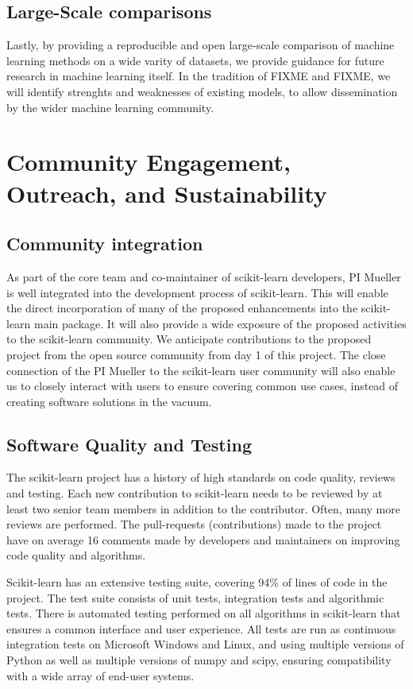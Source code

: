 \subsection{Large-Scale comparisons}
Lastly, by providing a reproducible and open large-scale comparison of machine learning
methods on a wide varity of datasets, we provide guidance for future research
in machine learning itself.
In the tradition of FIXME and FIXME, we will identify strenghts and weaknesses of existing
models, to allow dissemination by the wider machine learning community.

\section{Community Engagement, Outreach, and Sustainability}
\subsection{Community integration}
As part of the core team and co-maintainer of scikit-learn developers, PI
Mueller is well integrated into the development process of scikit-learn.
This will enable the direct incorporation of many of the proposed enhancements
into the scikit-learn main package.
It will also provide a wide exposure of the proposed activities to the
scikit-learn community. We anticipate contributions to the proposed
project from the open source community from day 1 of this project.
The close connection of the PI Mueller to the scikit-learn user community will
also enable us to closely interact with users to ensure covering common use cases,
instead of creating software solutions in the vacuum.

\subsection{Software Quality and Testing}
The scikit-learn project has a history of high standards on code quality, reviews and testing.
Each new contribution to scikit-learn needs to be reviewed by at least two senior team members
in addition to the contributor. Often, many more reviews are performed. The
pull-requests (contributions) made to the project have on average 16 comments
made by developers and maintainers on improving code quality and algorithms.

Scikit-learn has an extensive testing suite, covering 94\% of lines of code in the project.
The test suite consists of unit tests, integration tests and algorithmic tests.
There is automated testing performed on all algorithms in scikit-learn that ensures a common
interface and user experience.
All tests are run as continuous integration tests on Microsoft Windows and Linux, and using
multiple versions of Python as well as multiple versions of numpy and scipy, ensuring
compatibility with a wide array of end-user systems.

